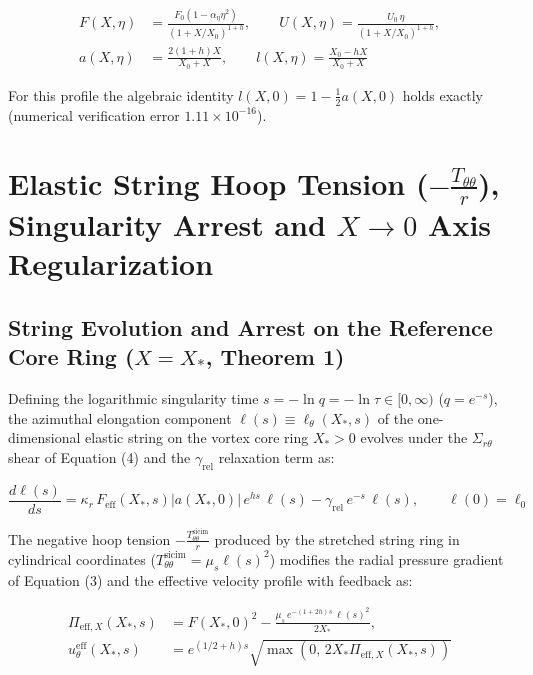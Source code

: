\documentclass[12pt,a4paper]{article}
\begin{document}
\begin{equation}
\begin{split}
F(X, \eta) &= \frac{F_0 (1 - \alpha_\eta \eta^2)}{(1 + X / X_0)^{1 + h}}, \qquad U(X, \eta) = \frac{U_0 \, \eta}{(1 + X / X_0)^{1 + h}}, \\
a(X, \eta) &= \frac{2(1+h)X}{X_0 + X}, \qquad l(X, \eta) = \frac{X_0 - h X}{X_0 + X}
\end{split}
\end{equation}

For this profile the algebraic identity $l(X, 0) = 1 - \frac{1}{2}a(X, 0)$ holds exactly (numerical verification error $1.11 \times 10^{-16}$).

\section{Elastic String Hoop Tension ($-\frac{T_{\theta\theta}}{r}$), Singularity Arrest and $X \to 0$ Axis Regularization}

\subsection{String Evolution and Arrest on the Reference Core Ring ($X = X_*$, Theorem 1)}

Defining the logarithmic singularity time $s = -\ln q = -\ln \tau \in [0, \infty)$ ($q = e^{-s}$), the azimuthal elongation component $\ell(s) \equiv \ell_\theta(X_*, s)$ of the one-dimensional elastic string on the vortex core ring $X_* > 0$ evolves under the $\Sigma_{r\theta}$ shear of Equation (4) and the $\gamma_{\mathrm{rel}}$ relaxation term as:

\begin{equation}
\frac{d \ell(s)}{ds} = \kappa_r \, F_{\mathrm{eff}}(X_*, s) |a(X_*, 0)| \, e^{h s} \, \ell(s) - \gamma_{\mathrm{rel}} \, e^{-s} \, \ell(s), \qquad \ell(0) = \ell_0
\end{equation}

The negative hoop tension $-\frac{T_{\theta\theta}^{\mathrm{sicim}}}{r}$ produced by the stretched string ring in cylindrical coordinates ($T_{\theta\theta}^{\mathrm{sicim}} = \mu_s \ell(s)^2$) modifies the radial pressure gradient of Equation (3) and the effective velocity profile with feedback as:

\begin{equation}
\begin{split}
\Pi_{\mathrm{eff}, X}(X_*, s) &= F(X_*, 0)^2 - \frac{\mu_s \, e^{-(1+2h)s} \, \ell(s)^2}{2 X_*}, \\
u_\theta^{\mathrm{eff}}(X_*, s) &= e^{(1/2 + h)s} \sqrt{\max\left( 0, \, 2 X_* \Pi_{\mathrm{eff}, X}(X_*, s) \right)}
\end{split}
\end{equation}
\end{document}
